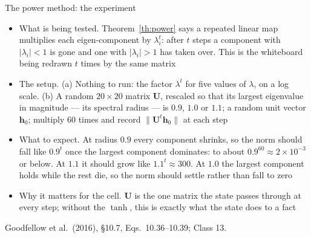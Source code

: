 \documentclass[aspectratio=169, 11pt]{beamer}
\newcommand{\srcline}[1]{%
  \par\vspace{0.25em}%
  {\scriptsize\color{mcMuted}\hfill #1\par}}
\newcommand{\src}[3]{}      %
\begin{document}
\begin{frame}{The power method: the experiment}
  \src{goodfellow2016}{equation}{10.36-10.39}
  \src{goodfellow2016}{section}{10.7}
  \vspace{-0.15em}
  {\footnotesize
  \begin{itemize}\itemsep0.28em
    \item \alert{What is being tested.} Theorem~\ref{th:power} says a
          repeated linear map multiplies each eigen-component by
          $\lambda_i^t$: after $t$ steps a component with $|\lambda_i| < 1$
          is gone and one with $|\lambda_i| > 1$ has taken over. This is the
          whiteboard being redrawn $t$ times by the same matrix
    \item \alert{The setup.} (a) Nothing to run: the factor $\lambda^t$ for
          five values of $\lambda$, on a log scale. (b) A random $20 \times 20$
          matrix $\mathbf{U}$, rescaled so that its largest eigenvalue in
          magnitude --- its \alert{spectral radius} --- is $0.9$, $1.0$ or
          $1.1$; a random unit vector $\mathbf{h}_0$; multiply $60$ times and
          record $\|\mathbf{U}^t\mathbf{h}_0\|$ at each step
    \item \alert{What to expect.} At radius $0.9$ every component shrinks,
          so the norm should fall like $0.9^t$ once the largest component
          dominates: to about $0.9^{60} \approx 2 \times 10^{-3}$ or below. At
          $1.1$ it should grow like $1.1^t \approx 300$. At $1.0$ the largest
          component holds while the rest die, so the norm should settle
          rather than fall to zero
    \item \alert{Why it matters for the cell.} $\mathbf{U}$ is the one matrix
          the state passes through at every step; without the $\tanh$, this
          is exactly what the state does to a fact
  \end{itemize}}
  \srcline{Goodfellow et al.\ (2016), \S10.7, Eqs.~10.36--10.39; Class 13.}
\end{frame}
\end{document}
